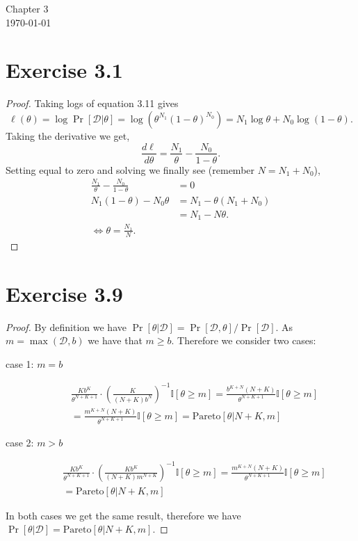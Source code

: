 \documentclass[12pt]{article}
\newcommand{\I}{\mathbb{I}}
\newcommand{\D}{\mathcal{D}}
\begin{document}
\begin{center}
{\Large Chapter 3}\\
\today
\end{center}
\section*{Exercise 3.1}
\begin{proof}
Taking logs of equation 3.11 gives
\[\ell(\theta) = \log \Pr[\D|\theta] = \log\left(\theta^{N_1}(1 - \theta)^{N_0} \right) = N_1 \log \theta + N_0 \log (1 - \theta).\] 
Taking the derivative we get,
\[\frac{d \ell}{d \theta} = \frac{N_1}{\theta} - \frac{N_0}{1 - \theta}.\]
Setting equal to zero and solving we finally see (remember $N = N_1 + N_0$),
\begin{align*}
    \frac{N_1}{\theta} - \frac{N_0}{1 - \theta} &= 0\\
    N_1 (1 - \theta) - N_0 \theta &= N_1 - \theta(N_1 + N_0)\\
    &= N_1 - N\theta.\\
    \iff \theta = \frac{N_1}{N}.
\end{align*}
\end{proof}
\section*{Exercise 3.9}
\begin{proof}
By definition we have $\Pr[\theta | \D]  = \Pr[\D, \theta] / \Pr[\D]$.
As $m = \max (\D, b)$ we have that $m \geq b$. Therefore we consider two cases:
\begin{description}
    \item[case 1: $m = b$]
        \begin{align*}
            \frac{Kb^K}{\theta^{N + K + 1}} \cdot \left(\frac{K}{(N + K)b^N}\right)^{-1} \I[\theta \geq m]
            = \frac{b^{K + N}(N+K)}{\theta^{N + K + 1}} \I[\theta \geq m]\\
            = \frac{m^{K + N}(N+K)}{\theta^{N + K + 1}} \I[\theta \geq m]
            = \text{Pareto}[\theta | N + K, m]
        \end{align*}
    \item[case 2: $m > b$]
        \begin{align*}
            \frac{Kb^K}{\theta^{N + K + 1}} \cdot
                \left(\frac{Kb^K}{(N + K)m^{N+K}}\right)^{-1} \I[\theta \geq m]
            = \frac{m^{K + N}(N+K)}{\theta^{N + K + 1}} \I[\theta \geq m]\\
            = \text{Pareto}[\theta | N + K, m]
        \end{align*}
\end{description}
In both cases we get the same result, therefore we have
$\Pr[\theta|\D] = \text{Pareto}[\theta| N + K, m]$.  \end{proof}
\end{document}

